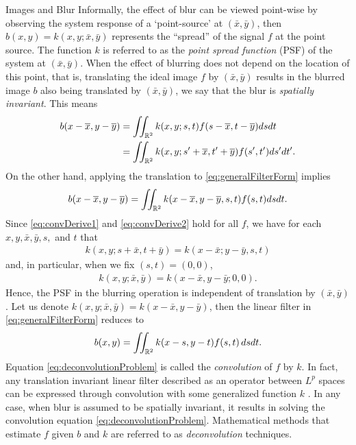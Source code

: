\begin{chapter}{Images and Blur}
  Informally, the effect of blur can be viewed point-wise by observing the system response of a `point-source' at $(\bar x,\bar y)$, %
  then $b(x,y) = k(x,y;\bar x,\bar y)$ represents the ``spread'' of the signal $f$ at the point source.
  The function $k$ is referred to as the \emph{point spread function} (PSF) of the system at $(\bar x,\bar y)$.
  When the effect of blurring does not depend on the location of this point, that is, translating the ideal image $f$ by $(\bar x, \bar y)$ results in the blurred image $b$ also being translated by $(\bar x,\bar y)$, we say that the blur is \emph{spatially invariant}. 
  This means
\begin{align} 
  b(x-\overline x,y-\overline y) 
  &= \iint_{\mathbb R^2} k(x,y;s,t) f(s-\overline x,t - \overline y)dsdt \nonumber\\
  &= \iint_{\mathbb R^2} k(x,y;s'+\overline x,t'+\overline y) f(s',t')ds'dt'.\label{eq:convDerive1}
\end{align}
  On the other hand, applying the translation to \eqref{eq:generalFilterForm} implies
\begin{equation} \label{eq:convDerive2}
  b(x-\overline x,y-\overline y) = \iint_{\mathbb R^2} k(x-\overline x,y-\overline y,s,t) f(s,t)dsdt. 
\end{equation}
  Since \eqref{eq:convDerive1} and \eqref{eq:convDerive2} hold for all $f$, we have for each $x,y,\bar x, \bar y,s,$ and $t$ that
\begin{align} 
 k(x,y;s+\bar x,t+\bar y) = k(x-\bar x;y-\bar y,s,t) 
\end{align}
  and, in particular, when we fix $(s,t) = (0,0)$,
\begin{align} 
 k(x,y;\bar x,\bar y) = k(x-\bar x,y-\bar y;0,0).
\end{align}
Hence, the PSF in the blurring operation is independent of translation by $(\bar x,\bar y)$.
  Let us denote $k(x,y;\bar x,\bar y) = k(x-\bar x,y-\bar y)$, then the linear filter in \eqref{eq:generalFilterForm} reduces to   
\begin{equation}\label{eq:deconvolutionProblem}
  b(x,y) = \iint_{\mathbb R^2} k(x-s,y-t) f(s,t)\,dsdt.
\end{equation}
  Equation \eqref{eq:deconvolutionProblem} is called the \emph{convolution} of $f$ by $k$.
  In fact, any translation invariant linear filter described as an operator between $L^p$ spaces can be expressed through convolution with some generalized function $k$ \citep{grafakos2014}.
  In any case, when blur is assumed to be spatially invariant, it results in solving the convolution equation \eqref{eq:deconvolutionProblem}.
  Mathematical methods that estimate $f$ given $b$ and $k$ are referred to as \emph{deconvolution} techniques.


\end{chapter}
